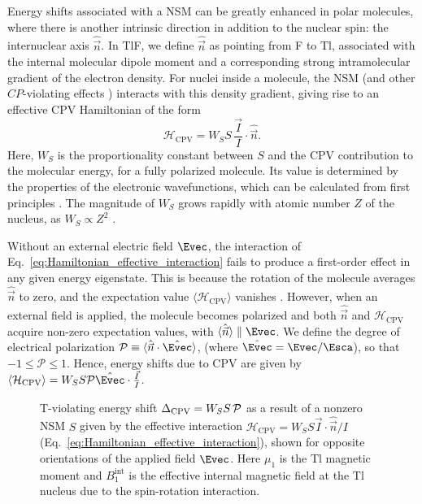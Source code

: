 Energy shifts associated with a NSM can be greatly enhanced in polar molecules, where there is another intrinsic direction in addition to the nuclear spin: the internuclear axis $\hat{\vec{n}}$. In TlF,  we define $\hat{\vec{n}}$ as pointing from F to Tl, associated with the internal molecular dipole moment and a corresponding strong intramolecular gradient of the electron density.  For nuclei inside a molecule, the NSM (and other $CP$-violating effects \cite{khriplovich1997}) interacts with this density gradient, giving rise to an effective CPV Hamiltonian of the form \cite{PhysRevA.101.042504}
\begin{equation}\label{eq:Hamiltonian_effective_interaction}
    \mathcal{H}_\text{CPV}= W_S S\,\frac{\vec{I}}{I} \cdot \hat{\vec{n}}.
\end{equation}
Here, $W_S$ is the proportionality constant between $S$ and the CPV contribution to the molecular energy, for a fully polarized molecule. Its value is determined by the properties of the electronic wavefunctions, which can be calculated from first principles \cite{PhysRevA.101.042504, doi:10.1002/qua.20418, PhysRevLett.88.073001, doi:10.1080/00268976.2020.1767814}. The magnitude of $W_S$ grows rapidly with atomic number $Z$ of the nucleus, as $W_S\propto Z^2$ \cite{khriplovich1991parity}.

Without an external electric field $\Evec$, the interaction of Eq.~\ref{eq:Hamiltonian_effective_interaction} fails to produce a first-order effect in any given energy eigenstate. This is because the rotation of the molecule averages $\hat{\vec n}$ to zero, and the expectation value $\langle\mathcal{H}_\text{CPV}\rangle$ vanishes \cite{cho1989tenfold, cho1991search}. However, when an external field is applied, the molecule becomes polarized and both
$\hat{\vec{n}}$ and $\mathcal{H}_\text{CPV}$  acquire non-zero expectation values, with $\langle\hat{\vec n}\rangle \parallel \Evec$. We define the degree of electrical polarization $\mathcal{P} \equiv \langle \hat{\vec{n}}\cdot\hat{\Evec} \rangle$, (where $\hat{\Evec} = \Evec/\Esca$), so that $-1\leq\mathcal{P}\leq1$. 
Hence, energy shifts due to CPV are given by  $\langle\mathcal{H}_\text{CPV}\rangle = W_S S \mathcal{P} \hat{\Evec} \cdot \frac{\vec{I}}{I}$.

\begin{figure}
    \centering
    \def\svgwidth{0.5\textwidth}
    
	\caption{T-violating energy shift $\Delta_{\rm CPV} = W_SS\,\mathcal{P}$ as a result of a nonzero NSM $S$ given by the effective interaction $\mathcal{H}_\text{CPV}= W_S S\vec{I}\cdot \hat{\vec{n}}/I$ (Eq.~\ref{eq:Hamiltonian_effective_interaction}), shown for opposite orientations of the applied field $\Evec$. Here $\mu_1$ is the Tl magnetic moment and $B_1^\mathrm{int}$ is the effective internal magnetic field at the Tl nucleus due to the spin-rotation interaction.
	}
	\label{fig:edm_shift}
\end{figure}

